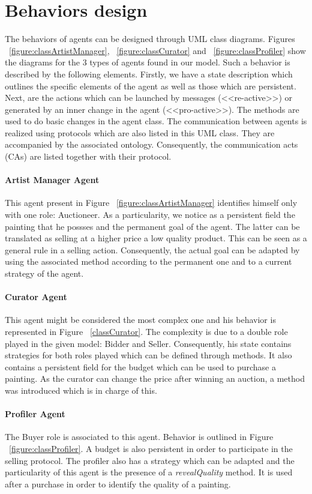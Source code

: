 \documentclass[a4paper,11pt]{report}
\begin{document}
  
  
  \section{Behaviors design} %
  The behaviors of agents can be designed through UML class diagrams. Figures 
  ~\ref{figure:classArtistManager}, ~\ref{figure:classCurator} and ~\ref{figure:classProfiler}
  show the diagrams for the 3 types of agents found in our model. Such a behavior
  is described by the following elements. Firstly, we have a state description which 
  outlines the specific elements of the agent as well as those which are persistent. Next, 
  are the actions which can be launched by messages (<<re-active>>) or generated by an inner change
  in the agent (<<pro-active>>). The methods are used to do basic changes in the agent class.
  The communication between agents is realized using protocols which are also listed in this UML class. They
  are accompanied by the associated ontology. Consequently, the communication acts (CAs) are listed
  together with their protocol.
  \paragraph{Artist Manager Agent} This agent present in Figure ~\ref{figure:classArtistManager} 
  identifies himself only with one role: Auctioneer. 
  As a particularity, we notice as a persistent field the painting that he possses
  and the permanent goal of the agent. The latter can be translated as selling at a higher price a low
  quality product. This can be seen as a general rule in a selling action. 
  Consequently, the actual goal can be adapted by using the associated method
  according to the permanent one and to a current strategy of the agent.
  \paragraph{Curator Agent} This agent might be considered the most complex one and his behavior
  is represented in Figure ~\ref{classCurator}. The complexity is due to a double role played in the
  given model: Bidder and Seller. Consequently, his state contains strategies for both roles played
  which can be defined through methods. It also contains a persistent field for the budget which can
  be used to purchase a painting. As the curator can change the price after winning an auction, a
  method was introduced which is in charge of this.
  \paragraph{Profiler Agent} The Buyer role is associated to this agent. Behavior is outlined in
  Figure ~\ref{figure:classProfiler}. A budget is also persistent in order to participate in the
  selling protocol. The profiler also has a strategy which can be adapted and the particularity of this
  agent is the presence of a \textit{revealQuality} method. It is used after a purchase in order
  to identify the quality of a painting.
  
\end{document}
